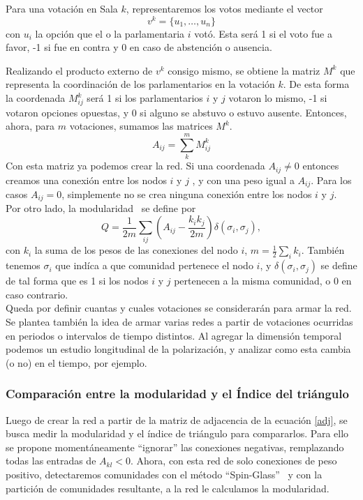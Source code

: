 \documentclass{proyectotesis}
\begin{document}
Para una votación en Sala $k$, representaremos los votos mediante el vector 
\begin{equation}
    v^k = \{u_1,\dots,u_n\}
\end{equation}
con $u_i$ la opción que el o la parlamentaria $i$ votó. Esta será 1 si el voto fue a favor, -1 si fue en contra y 0 en caso de abstención o ausencia.

Realizando el producto externo de $v^k$ consigo mismo, se obtiene la matriz $M^k$ que representa la coordinación de los parlamentarios en la votación $k$. De esta forma la coordenada $M^k_{ij}$ será 1 si los parlamentarios $i$ y $j$ votaron lo mismo, -1 si votaron opciones opuestas, y 0 si alguno se abstuvo o estuvo ausente. Entonces, ahora, para $m$ votaciones, sumamos las matrices $M^k$.
\begin{equation}
    A_{ij} = \sum_k^m M^k_{ij} \label{adj}
\end{equation}
Con esta matriz ya podemos crear la red. Si una coordenada $A_{ij}\neq 0$ entonces creamos una conexión entre los nodos $i$ y $j$ , y con una peso igual a $A_{ij}$. Para los casos $A_{ij} = 0$, simplemente no se crea ninguna conexión entre los nodos $i$ y $j$.\\

Por otro lado, la modularidad~\cite{newman_finding_2004} se define por
\begin{equation}
    Q = \frac{1}{2m}\sum_{ij} \left( A_{ij} - \frac{k_i k_j}{2m}  \right) \delta(\sigma_i,\sigma_j) \label{mod}
,\end{equation}
con $k_i$ la suma de los pesos de las conexiones del nodo $i$, $m = \frac{1}{2} \sum_i k_i$. También tenemos $\sigma_i$ que indíca a que comunidad pertenece el nodo $i$, y $\delta(\sigma_i,\sigma_j)$ se define de tal forma que es 1 si los nodos $i$ y $j$ pertenecen a la misma comunidad, o 0 en caso contrario.\\

Queda por definir cuantas y cuales votaciones se considerarán para armar la red. Se plantea también la idea de armar varias redes a partir de votaciones ocurridas en periodos o intervalos de tiempo distintos. Al agregar la dimensión temporal podemos un estudio longitudinal de la polarización, y analizar como esta cambia (o no) en el tiempo, por ejemplo.

\subsubsection{Comparación entre la modularidad y el Índice del triángulo} 
Luego de crear la red a partir de la matriz de adjacencia de la ecuación \eqref{adj}, se busca medir la modularidad y el índice de triángulo para compararlos. Para ello se propone momentáneamente ``ignorar'' las conexiones negativas, remplazando todas las entradas de $A_{kl} < 0$. Ahora, con esta red de solo conexiones de peso positivo, detectaremos comunidades con el método ``Spin-Glass''~\cite{reichardt_statistical_2006} y con la partición de comunidades resultante, a la red le calculamos la modularidad. \\
\end{document}
